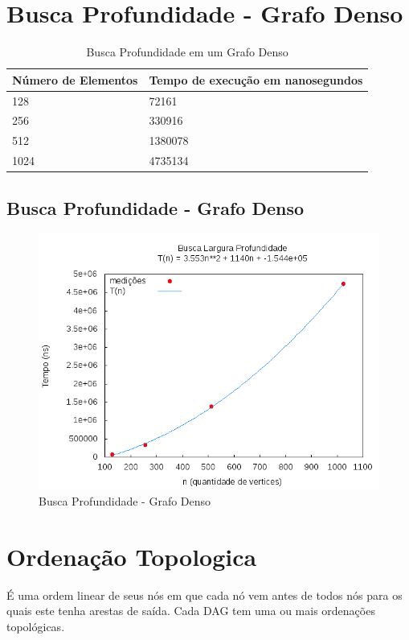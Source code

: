 \documentclass[12pt,a4paper,twoside]{report}
\begin{document}
\section{Busca Profundidade - Grafo Denso}
\begin{table}[H]
\centering
\caption{Busca Profundidade em um Grafo Denso}
\label{my-label}
\begin{tabular}{|l|l|}
\hline
\multicolumn{1}{|c|}{\textbf{Número de Elementos}} & \multicolumn{1}{c|}{\textbf{Tempo de execução em nanosegundos}} \\ \hline
128 & 72161 \\ \hline
256 & 330916 \\ \hline
512 & 1380078 \\ \hline
1024 & 4735134 \\ \hline
\end{tabular}
\end{table}

\subsection{Busca Profundidade - Grafo Denso}
\begin{figure}[H]
    \centering
    \includegraphics[width=0.7\linewidth]{graficos/BuscaProfundidade/Denso/Denso.png}
  \caption{Busca Profundidade - Grafo Denso}
\end{figure}

\section{Ordenação Topologica}

 É uma ordem linear de seus nós em que cada nó vem antes de todos nós para os quais este tenha arestas de saída. Cada DAG tem uma ou mais ordenações topológicas.
\end{document}
